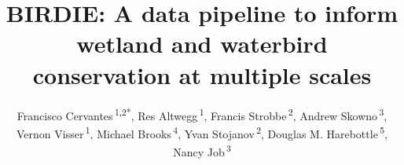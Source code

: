 \documentclass[utf8]{frontiersSCNS}
\def\Authors{
  Francisco Cervantes\,\textsuperscript{1,2*},
  Res Altwegg\,\textsuperscript{1},
  Francis Strobbe\,\textsuperscript{2},
  Andrew Skowno\,\textsuperscript{3},
  Vernon Visser\,\textsuperscript{1},
  Michael Brooks\,\textsuperscript{4},
  Yvan Stojanov\,\textsuperscript{2},
  Douglas M. Harebottle\,\textsuperscript{5},
  Nancy Job\,\textsuperscript{3}}
\def\firstAuthorLast{Cervantes {et~al.}}
\begin{document}
\onecolumn
{}


\title[BIRDIE biodiversity data pipeline]{BIRDIE: A data pipeline to
inform wetland and waterbird conservation at multiple scales}
\author[\firstAuthorLast]{\Authors}
\address{} %
\correspondance{} %

\extraAuth{}%


\maketitle
\end{document}

